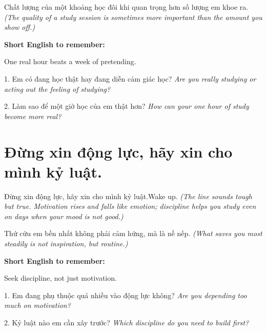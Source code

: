 \begin{baihoc}
Chất lượng của một khoảng học đôi khi quan trọng hơn số lượng em khoe ra.
\textit{(The quality of a study session is sometimes more important than the amount you show off.)}
\end{baihoc}

\begin{ghinhoanh}
\textbf{Short English to remember:}

One real hour beats a week of pretending.

\end{ghinhoanh}

\begin{tuhocnhanh}
1. Em có đang học thật hay đang diễn cảm giác học? \textit{Are you really studying or acting out the feeling of studying?}

2. Làm sao để một giờ học của em thật hơn? \textit{How can your one hour of study become more real?}
\end{tuhocnhanh}
\ngancach

\section{Đừng xin động lực, hãy xin cho mình kỷ luật.}
\begin{truyen}{Đừng xin động lực, hãy xin cho mình kỷ luật.}{Wake up.}
\textit{(The line sounds tough but true. Motivation rises and falls like emotion; discipline helps you study even on days when your mood is not good.)}
\end{truyen}

\begin{baihoc}
Thứ cứu em bền nhất không phải cảm hứng, mà là nề nếp.
\textit{(What saves you most steadily is not inspiration, but routine.)}
\end{baihoc}

\begin{ghinhoanh}
\textbf{Short English to remember:}

Seek discipline, not just motivation.

\end{ghinhoanh}

\begin{tuhocnhanh}
1. Em đang phụ thuộc quá nhiều vào động lực không? \textit{Are you depending too much on motivation?}

2. Kỷ luật nào em cần xây trước? \textit{Which discipline do you need to build first?}
\end{tuhocnhanh}
\ngancach

